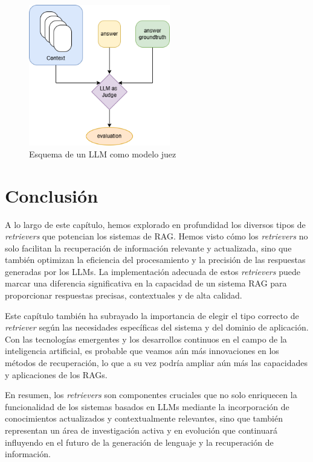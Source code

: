 \begin{figure}[h]
\centering
\includegraphics[width=0.55\textwidth]{figuras/capitulo5/llm_judge.png}
\caption{Esquema de un LLM como modelo juez}
\label{fig:llm_judge}
\end{figure}

\section{Conclusión}

A lo largo de este capítulo, hemos explorado en profundidad los diversos tipos de \textit{retrievers} que potencian los sistemas de RAG. Hemos visto cómo los \textit{retrievers} no solo facilitan la recuperación de información relevante y actualizada, sino que también optimizan la eficiencia del procesamiento y la precisión de las respuestas generadas por los LLMs. La implementación adecuada de estos \textit{retrievers} puede marcar una diferencia significativa en la capacidad de un sistema RAG para proporcionar respuestas precisas, contextuales y de alta calidad.

Este capítulo también ha subrayado la importancia de elegir el tipo correcto de \textit{retriever} según las necesidades específicas del sistema y del dominio de aplicación. Con las tecnologías emergentes y los desarrollos continuos en el campo de la inteligencia artificial, es probable que veamos aún más innovaciones en los métodos de recuperación, lo que a su vez podría ampliar aún más las capacidades y aplicaciones de los RAGs.

En resumen, los \textit{retrievers} son componentes cruciales que no solo enriquecen la funcionalidad de los sistemas basados en LLMs mediante la incorporación de conocimientos actualizados y contextualmente relevantes, sino que también representan un área de investigación activa y en evolución que continuará influyendo en el futuro de la generación de lenguaje y la recuperación de información.





